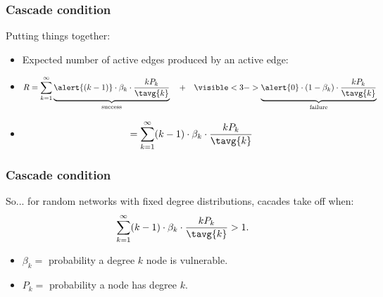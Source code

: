  \begin{frame}
    \frametitle{Cascade condition}

    \begin{block}{Putting things together:}
      \begin{itemize}
      \item<1->
        Expected number of active edges produced by an active edge:
      \item<2->[]
        $$
        R =
        \sum_{k=1}^{\infty} 
        \underbrace{
          \alert{(k-1)} 
          \cdot
          \beta_k 
          \cdot
          \frac{k P_k}{\tavg{k}} 
        }_{\textrm{success}}
        \quad
        + 
        \quad
        \visible<3->{
          \underbrace{
            \alert{0}
            \cdot
            (1 - \beta_k) 
            \cdot
            \frac{k P_k}{\tavg{k}}
          }_{\textrm{failure}}}
        $$
      \item<4->[]
        $$
        =
        \sum_{k=1}^{\infty} 
        (k-1) 
        \cdot
        \beta_k 
        \cdot
        \frac{k P_k}{\tavg{k}}
        $$
      \end{itemize}
    \end{block}

  \end{frame}


 \begin{frame}
    \frametitle{Cascade condition}

    \begin{block}{}
      So... for random networks with fixed degree distributions,
      cacades take off when:
      $$
      \sum_{k=1}^{\infty}
      (k-1) 
      \cdot
      \beta_k 
      \cdot
      \frac{k P_k}{\tavg{k}} > 1.
      $$
      \begin{itemize}
      \item $\beta_k =$ probability a degree $k$ node is vulnerable.
      \item $P_k =$ probability a node has degree $k$.
      \end{itemize}
    \end{block}

\end{frame}


